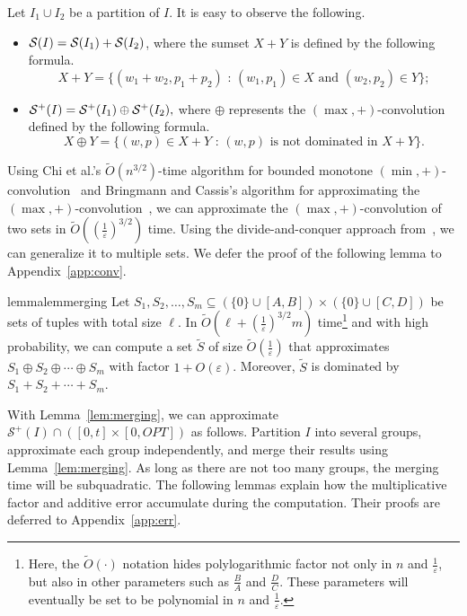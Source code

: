 \documentclass[a4paper,UKenglish,cleveref, autoref, thm-restate, pdfa]{lipics-v2021}
\newcommand{\eps}{\varepsilon}
\begin{document}
Let $I_1 \cup I_2$ be a partition of $I$. It is easy to observe the following.
\begin{itemize}
\item \(
    {\cal S}(I) = {\cal S}(I_1) + {\cal S}(I_2)
\), where the sumset $X + Y$ is defined by the following formula.
\[
    X + Y = \{\text{$(w_1 + w_2, p_1 + p_2)$ : $(w_1, p_1) \in X$ and $(w_2, p_2) \in Y$}\};
\]
\item \(
    {\cal S}^+(I) = {\cal S}^+(I_1) \oplus {\cal S}^+(I_2),
\)
where $\oplus$ represents the $(\max, +)$-convolution defined by the following formula.
\[
    X \oplus Y = \{\text{$(w, p) \in X + Y$ : $(w, p)$ is not dominated in $X+Y$}\}.
\]
\end{itemize}

Using Chi et al.'s $\tilde{O}(n^{3/2})$-time algorithm for bounded monotone $(\min,+)$-convolution~\cite{CDXZ22} and Bringmann and Cassis's algorithm for approximating the $(\max,+)$-convolution~\cite[Lemma 28 in the full version]{BC22}, we can approximate the $(\max,+)$-convolution of two sets in $\tilde{O}((\frac{1}{\eps})^{3/2})$ time. Using the divide-and-conquer approach from~\cite{Chan18}, we can generalize it to multiple sets. We defer the proof of the following lemma to Appendix~\ref{app:conv}.

\begin{restatable}{lemma}{lemmerging}\label{lem:merging}
    Let $S_1, S_2, \ldots, S_m \subseteq (\{0\} \cup [A, B]) \times (\{0\} \cup [C, D])$ be sets of tuples with total size $\ell$. In $\tilde{O}(\ell + (\frac{1}{\eps})^{3/2}m)$ time\footnote{Here, the $\tilde{O}(\cdot)$ notation hides polylogarithmic factor not only in $n$ and $\frac{1}{\eps}$, but also in other parameters such as $\frac{B}{A}$ and $\frac{D}{C}$. These parameters will eventually be set to be polynomial in $n$ and $\frac{1}{\eps}$.} and with high probability, we can compute a set $\tilde{S}$ of size $\tilde{O}(\frac{1}{\eps})$ that approximates $S_1 \oplus S_2 \oplus \cdots \oplus S_m$ with factor $1 + O(\eps)$.  Moreover, $\tilde{S}$ is dominated by $S_1 + S_2 + \cdots + S_m$.
\end{restatable}

With Lemma~\ref{lem:merging}, we can approximate $\mathcal{S}^+(I) \cap ([0, t]\times [0, OPT])$ as follows. Partition $I$ into several groups, approximate each group independently, and merge their results using Lemma~\ref{lem:merging}.  As long as there are not too many groups, the merging time will be subquadratic. The following lemmas explain how the multiplicative factor and additive error accumulate during the computation. Their proofs are deferred to Appendix~\ref{app:err}.
\end{document}
